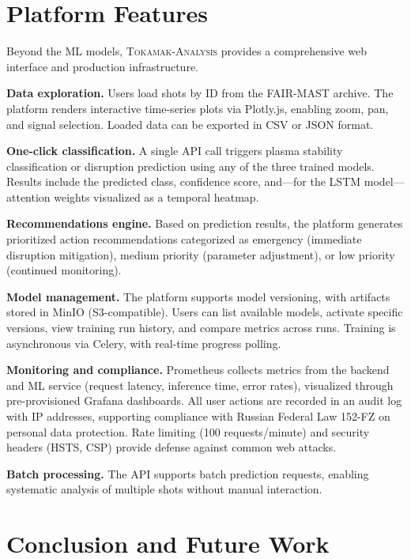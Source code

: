 \documentclass[twocolumn]{article}
\begin{document}
\section{Platform Features}
\label{sec:platform}

Beyond the ML models, \textsc{Tokamak-Analysis} provides a
comprehensive web interface and production infrastructure.

\textbf{Data exploration.}
Users load shots by ID from the FAIR-MAST archive.
The platform renders interactive time-series plots via
Plotly.js, enabling zoom, pan, and signal selection.
Loaded data can be exported in CSV or JSON format.

\textbf{One-click classification.}
A single API call triggers plasma stability classification
or disruption prediction using any of the three trained models.
Results include the predicted class, confidence score,
and---for the LSTM model---attention weights visualized as a
temporal heatmap.

\textbf{Recommendations engine.}
Based on prediction results, the platform generates
prioritized action recommendations categorized as emergency
(immediate disruption mitigation), medium priority
(parameter adjustment), or low priority (continued monitoring).

\textbf{Model management.}
The platform supports model versioning, with artifacts stored
in MinIO (S3-compatible).
Users can list available models, activate specific versions,
view training run history, and compare metrics across runs.
Training is asynchronous via Celery, with real-time progress
polling.

\textbf{Monitoring and compliance.}
Prometheus collects metrics from the backend and ML service
(request latency, inference time, error rates), visualized
through pre-provisioned Grafana dashboards.
All user actions are recorded in an audit log with IP
addresses, supporting compliance with Russian Federal
Law 152-FZ on personal data protection.
Rate limiting (100 requests/minute) and security headers
(HSTS, CSP) provide defense against common web attacks.

\textbf{Batch processing.}
The API supports batch prediction requests, enabling
systematic analysis of multiple shots without manual
interaction.


\section{Conclusion and Future Work}
\label{sec:conclusion}
\end{document}
